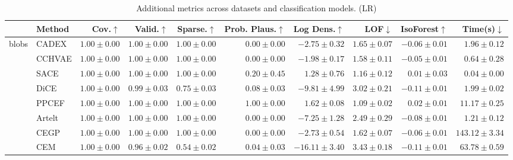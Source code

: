 \begin{table}[ht]
\centering
\caption{Additional metrics across datasets and classification models. (LR)}
\label{tab:other_metrics_multinomiallogisticregression}
\begin{center}
\begin{sc}
\begin{scriptsize}
\begin{tabular}{l|l|rrrrrrrr}
\toprule
 & Method & Cov.$\uparrow$ & Valid.$\uparrow$ & Sparse.$\uparrow$ & Prob. Plaus.$\uparrow$ & Log Dens.$\uparrow$ & LOF$\downarrow$ & IsoForest$\uparrow$ & Time(s)$\downarrow$ \\
\midrule
\multirow{9}{*}{blobs} & CADEX & $\boldsymbol{1.00\pm{0.00}}$ & $\boldsymbol{1.00\pm{0.00}}$ & $\boldsymbol{1.00\pm{0.00}}$ & $0.00\pm{0.00}$ & $-2.75\pm{0.32}$ & $1.65\pm{0.07}$ & $-0.06\pm{0.01}$ & $1.96\pm{0.12}$ \\
 & CCHVAE & $\boldsymbol{1.00\pm{0.00}}$ & $\boldsymbol{1.00\pm{0.00}}$ & $\boldsymbol{1.00\pm{0.00}}$ & $0.00\pm{0.00}$ & $-1.98\pm{0.17}$ & $1.58\pm{0.11}$ & $-0.05\pm{0.01}$ & $0.64\pm{0.28}$ \\
 & SACE & $\boldsymbol{1.00\pm{0.00}}$ & $\boldsymbol{1.00\pm{0.00}}$ & $\boldsymbol{1.00\pm{0.00}}$ & $0.20\pm{0.45}$ & $1.28\pm{0.76}$ & $1.16\pm{0.12}$ & $0.01\pm{0.03}$ & $\boldsymbol{0.04\pm{0.00}}$ \\
 & DiCE & $\boldsymbol{1.00\pm{0.00}}$ & $0.99\pm{0.03}$ & $0.75\pm{0.03}$ & $0.08\pm{0.03}$ & $-9.81\pm{4.99}$ & $3.02\pm{0.21}$ & $-0.11\pm{0.01}$ & $1.99\pm{0.02}$ \\
 & PPCEF & $\boldsymbol{1.00\pm{0.00}}$ & $\boldsymbol{1.00\pm{0.00}}$ & $\boldsymbol{1.00\pm{0.00}}$ & $\boldsymbol{1.00\pm{0.00}}$ & $\boldsymbol{1.62\pm{0.08}}$ & $\boldsymbol{1.09\pm{0.02}}$ & $\boldsymbol{0.02\pm{0.01}}$ & $11.17\pm{0.25}$ \\
 & Artelt & $\boldsymbol{1.00\pm{0.00}}$ & $\boldsymbol{1.00\pm{0.00}}$ & $\boldsymbol{1.00\pm{0.00}}$ & $0.00\pm{0.00}$ & $-7.25\pm{1.28}$ & $2.49\pm{0.29}$ & $-0.08\pm{0.01}$ & $1.21\pm{0.12}$ \\
 & CEGP & $\boldsymbol{1.00\pm{0.00}}$ & $\boldsymbol{1.00\pm{0.00}}$ & $\boldsymbol{1.00\pm{0.00}}$ & $0.00\pm{0.00}$ & $-2.73\pm{0.54}$ & $1.62\pm{0.07}$ & $-0.06\pm{0.01}$ & $143.12\pm{3.34}$ \\
 & CEM & $\boldsymbol{1.00\pm{0.00}}$ & $0.96\pm{0.02}$ & $0.54\pm{0.02}$ & $0.04\pm{0.03}$ & $-16.11\pm{3.40}$ & $3.43\pm{0.18}$ & $-0.11\pm{0.01}$ & $63.78\pm{0.59}$ \\

\end{tabular}
\end{scriptsize}
\end{sc}
\end{center}
\end{table}

